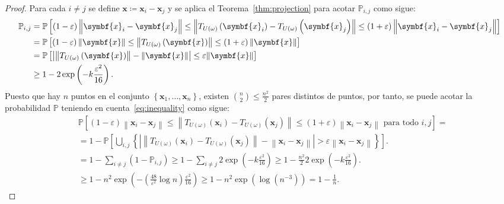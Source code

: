 \begin{proof}
	Para cada $i\neq j$ se define
	$\symbf{x}\coloneqq\symbf{x}_i-\symbf{x}_{j}$ y se aplica el
	Teorema~\ref{thm:projection} para acotar $\mathbb{P}_{i,j}$ como sigue:
	\begin{align}
		\mathbb{P}_{i,j} & =
		\mathbb{P}
		\left[
			\left(1-\varepsilon\right)
			\left\|
			\symbf{x}_{i}-
			\symbf{x}_{j}
			\right\|\leq
			\left\|
			T_{U\left(\omega\right)}\left(\symbf{x}_{i}\right)-
			T_{U\left(\omega\right)}\left(\symbf{x}_{j}\right)\right\|
			\leq
			\left(1+\varepsilon\right)
			\left\|
			\symbf{x}_{i}-
			\symbf{x}_{j}
			\right\|
		\right]        \notag                  \\
		                 & =
		\mathbb{P}
		\left[
			\left(1-\varepsilon\right)
			\left\|\symbf{x}\right\|\leq
			\left\|T_{U\left(\omega\right)}\left(\symbf{x}\right)\right\|\leq
			\left(1+\varepsilon\right)
			\left\|\symbf{x}\right\|
		\right]           \notag               \\
		                 & =
		\mathbb{P}
		\left[
			\left|\left\|T_{U\left(\omega\right)}\left(\symbf{x}\right)\right\|-\|\symbf{x}\|\right| \leq
		\varepsilon\|\symbf{x}\|\right] \notag \\
		                 & \geq
		1-
		2\exp\left(-k\frac{\varepsilon^{2}}{16}\right).\label{eq:inequality}
	\end{align}
	Puesto que hay $n$ puntos en el conjunto
	$\left\{\symbf{x}_{1},\dotsc,\symbf{x}_{n}\right\}$, existen
	$\binom{n}{2}\leq\frac{n^{2}}{2}$ pares distintos de puntos, por
	tanto, se puede acotar la probabilidad $\mathbb{P}$ teniendo en
	cuenta~\eqref{eq:inequality} como sigue:
	\begin{align*}
		 &
		\mathbb{P}
		\left[
			\left(1-\varepsilon\right)
			\left\|
			\symbf{x}_{i}-
			\symbf{x}_{j}
			\right\|\leq
			\left\|
			T_{U\left(\omega\right)}\left(\symbf{x}_{i}\right)-
			T_{U\left(\omega\right)}\left(\symbf{x}_{j}\right)
			\right\|\leq
			\left(1+\varepsilon\right)
			\left\|\symbf{x}_{i}-\symbf{x}_{j}\right\|
		\text { para todo } i,j\right]=               \\
		 & =
		1-\mathbb{P}
		\left[
			\bigcup_{i,j}
			\left\{
			\left|
			\left\|
			T_{U\left(\omega\right)}\left(\symbf{x}_{i}\right)-
			T_{U\left(\omega\right)}\left(\symbf{x}_{j}\right)
			\right\|-
			\left\|
			\symbf{x}_{i}-
			\symbf{x}_{j}
			\right\|
			\right|>
			\varepsilon
			\left\|
			\symbf{x}_{i}-\symbf{x}_{j}
			\right\|
			\right\}
		\right].                                      \\
		 & =
		1-
		\sum_{i\neq j}
		\left(1-\mathbb{P}_{i,j}\right)\geq
		1-\sum_{i\neq j}
		2\exp\left(-k\frac{\varepsilon^2}{16}\right)\geq
		1-\frac{n^2}{2}
		2\exp\left(-k\frac{\varepsilon^2}{16}\right). \\
		 & \geq
		1-n^{2}
		\exp
		\left(
		-\left(\frac{48}{\varepsilon^2}\log n\right)
		\frac{\varepsilon^2}{16}
		\right)\geq
		1-
		n^{2}\exp\left(\log\left(n^{-3}\right)\right)=
		1-\frac{1}{n}.
	\end{align*}
\end{proof}

